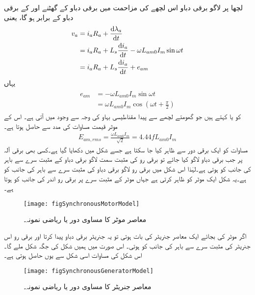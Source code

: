 لچھا  پر لاگو برقی دباو اس لچھے کی مزاحمت  میں برقی دباو کے گھٹنے اور  کے برقی دباو کے برابر ہو گا، یعنی
\begin{gather}
\begin{aligned}\label{مساوات_معاصر_دباو_مساوی_مزاحمت_گھتاو_اور_پیدا_دباو}
v_a&=i_a R_a+\frac{\dif \lambda_a}{\dif t}\\
&=i_a R_a+L_s \frac{\dif i_a}{\dif t}-\omega L_{am0} I_m \sin \omega t\\
&=i_a R_a+L_s \frac{\dif i_a}{\dif t}+e_{am}
\end{aligned}
\end{gather}
یہاں
\begin{gather}
\begin{aligned}
e_{am}&=-\omega L_{am0} I_m \sin \omega t\\
&=\omega L_{am0} I_m \cos \left (\omega t+\frac{\pi}{2} \right)
\end{aligned}
\end{gather}
کو  یا  کہتے ہیں جو گھومتے لچھے سے پیدا مقناطیسی بہاو کی وجہ سے وجود میں آتی ہے۔  اس کے موثر قیمت  مساوات   کی مدد سے حاصل ہوتا ہے۔
\begin{align}\label{مساوات_معاصر_موثر_پیدا_دباو}
E_{am,rms}=\frac{\omega L_{am0} I_m}{\sqrt{2}}=4.44 f L_{am0} I_m
\end{align}
مساوات   کو ایک برقی دور سے ظاہر کیا جا سکتا ہے جسے شکل   میں دکھایا گیا ہے۔کسی بھی برقی آلہ پر جب برقی دباو لاگو کیا جائے تو برقی رو کی مثبت سمت لاگو برقی دباو کے مثبت سرے سے باہر کی جانب کو ہوتی ہے۔لہٰذا اس شکل میں برقی رو  لاگو برقی دباو  کی مثبت سرے سے باہر کی جانب کو ہے۔یہ شکل ایک موٹر کو ظاہر کرتی ہے جہاں موٹر کے مثبت سرے پر برقی رو اندر کی جانب کو ہوتا ہے۔
\begin{figure}
\centering
\texttt{[image: figSynchronousMotorModel]}
\caption{معاصر موٹر کا مساوی دور یا ریاضی نمونہ۔}
\label{شکل_معاصر_موٹر_کا_مساوی_دور}
\end{figure}
اگر موٹر کی بجائے ایک معاصر جنریٹر کی بات ہوتی تو یہ جنریٹر برقی دباو پیدا کرتا اور برقی رو اس جنریٹر کی مثبت سرے سے باہر کی جانب کو ہوتی۔ اس صورت میں ہمیں شکل   کی جگہ شکل   ملے گا۔اس شکل کی مساوات اسی شکل سے یوں حاصل ہوتی ہے۔
\begin{figure}
\centering
\texttt{[image: figSynchronousGeneratorModel]}
\caption{معاصر جنریٹر کا مساوی دور یا ریاضی نمونہ۔}
\label{شکل_معاصر_جنریٹر_کا_مساوی_دور}
\end{figure}

